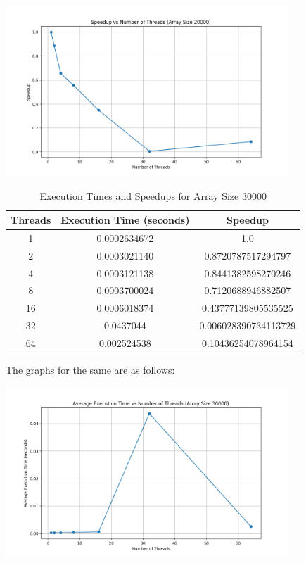 \documentclass[12pt]{article}
\begin{document}
\begin{center}
    \includegraphics[width=0.8\textwidth]{speedup_vs_threads_20000.png}
    \label{fig:20000}
\end{center}

\begin{table}[h!]
    \centering
    \begin{tabular}{|c|c|c|}
    \hline
    \textbf{Threads} & \textbf{Execution Time (seconds)} & \textbf{Speedup} \\ \hline
    1  & 0.0002634672  & 1.0 \\ \hline
    2  & 0.0003021140  & 0.8720787517294797 \\ \hline
    4  & 0.0003121138  & 0.8441382598270246 \\ \hline
    8  & 0.0003700024  & 0.7120688946882507 \\ \hline
    16 & 0.0006018374  & 0.43777139805535525 \\ \hline
    32 & 0.0437044     & 0.006028390734113729 \\ \hline
    64 & 0.002524538   & 0.10436254078964154 \\ \hline
    \end{tabular}
    \caption{Execution Times and Speedups for Array Size 30000}
    \label{table:execution_times_speedups_30000}
\end{table}
The graphs for the same are as follows:
\begin{center}
    \includegraphics[width=0.8\textwidth]{execution_time_vs_threads_30000.png}
    \label{fig:30000}
\end{center}
\end{document}
